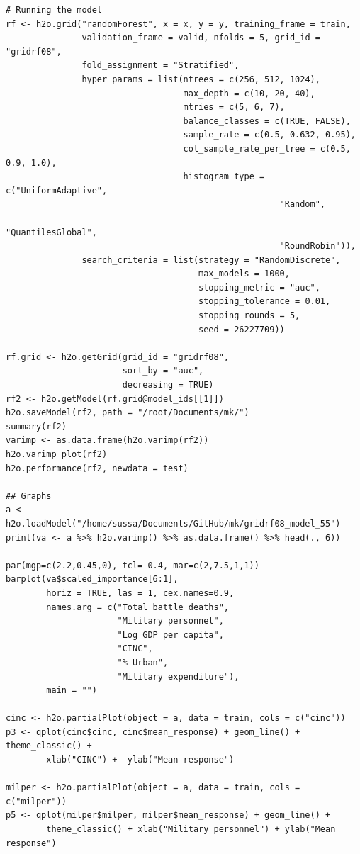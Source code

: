 \begin{verbatim}
# Running the model
rf <- h2o.grid("randomForest", x = x, y = y, training_frame = train, 
               validation_frame = valid, nfolds = 5, grid_id = "gridrf08",
               fold_assignment = "Stratified",
               hyper_params = list(ntrees = c(256, 512, 1024),
                                   max_depth = c(10, 20, 40),
                                   mtries = c(5, 6, 7),
                                   balance_classes = c(TRUE, FALSE),
                                   sample_rate = c(0.5, 0.632, 0.95),
                                   col_sample_rate_per_tree = c(0.5, 0.9, 1.0),
                                   histogram_type = c("UniformAdaptive",
                                                      "Random",
                                                      "QuantilesGlobal",
                                                      "RoundRobin")),
               search_criteria = list(strategy = "RandomDiscrete", 
                                      max_models = 1000, 
                                      stopping_metric = "auc", 
                                      stopping_tolerance = 0.01, 
                                      stopping_rounds = 5, 
                                      seed = 26227709)) 

rf.grid <- h2o.getGrid(grid_id = "gridrf08",
                       sort_by = "auc",
                       decreasing = TRUE)
rf2 <- h2o.getModel(rf.grid@model_ids[[1]])
h2o.saveModel(rf2, path = "/root/Documents/mk/")
summary(rf2)
varimp <- as.data.frame(h2o.varimp(rf2))
h2o.varimp_plot(rf2)
h2o.performance(rf2, newdata = test)

## Graphs
a <- h2o.loadModel("/home/sussa/Documents/GitHub/mk/gridrf08_model_55")
print(va <- a %>% h2o.varimp() %>% as.data.frame() %>% head(., 6)) 

par(mgp=c(2.2,0.45,0), tcl=-0.4, mar=c(2,7.5,1,1))
barplot(va$scaled_importance[6:1],
        horiz = TRUE, las = 1, cex.names=0.9,
        names.arg = c("Total battle deaths", 
                      "Military personnel",
                      "Log GDP per capita", 
                      "CINC",
                      "% Urban",
                      "Military expenditure"),
        main = "")

cinc <- h2o.partialPlot(object = a, data = train, cols = c("cinc"))
p3 <- qplot(cinc$cinc, cinc$mean_response) + geom_line() + theme_classic() + 
        xlab("CINC") +  ylab("Mean response")

milper <- h2o.partialPlot(object = a, data = train, cols = c("milper"))
p5 <- qplot(milper$milper, milper$mean_response) + geom_line() +
        theme_classic() + xlab("Military personnel") + ylab("Mean response")


\end{verbatim}
